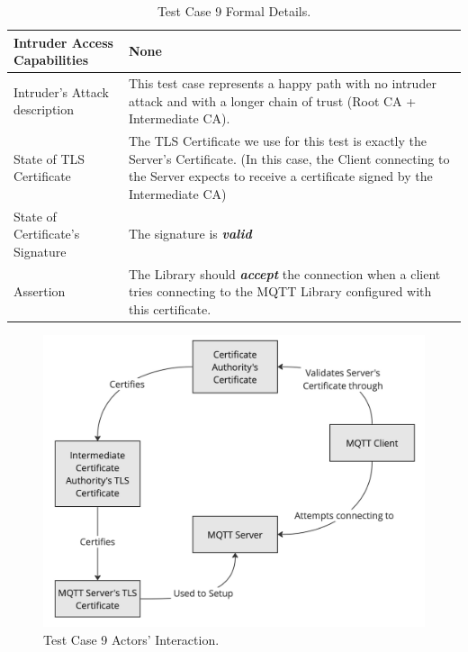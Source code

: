 \documentclass[binding=0.6cm,noexaminfo]{sapthesis}
\begin{document}
\begin{table}
\begin{center}
\begin{tabular}{| p{6cm} | p{6cm} |}
\hline
Intruder Access Capabilities & None \\
\hline
Intruder’s Attack description & This test case represents a happy path with no intruder attack and with a longer chain of trust (Root CA + Intermediate CA). \\
\hline
State of TLS Certificate & The TLS Certificate we use for this test is exactly the Server’s Certificate. (In this case, the Client connecting to the Server expects to receive a certificate signed by the Intermediate CA) \\
\hline
State of Certificate’s Signature & The signature is \textbf{\textit{valid}} \\
\hline
Assertion & The Library should \textbf{\textit{accept}} the connection when a client tries connecting to the MQTT Library configured with this certificate. \\
\hline
\end{tabular}
\caption{Test Case 9 Formal Details.}
\label{tab:tc9}
\end{center}
\end{table}

\begin{figure}[htb]
	\includegraphics[width=14cm]{TC9}
	\caption{Test Case 9 Actors' Interaction.}
	\label{fig:tc9}
\end{figure}
\end{document}
